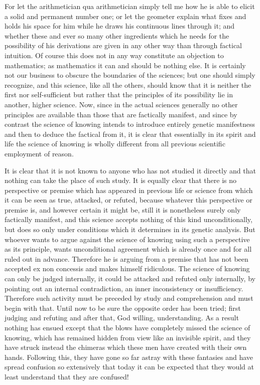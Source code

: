 For let the arithmetician qua arithmetician simply tell me
how he is able to elicit a solid and permanent number one;
or let the geometer explain what fixes and holds his space
for him while he draws his continuous lines through it;
and whether these and ever so many other ingredients
which he needs for the possibility of his derivations are
given in any other way than through factical intuition.
Of course this does not in any way constitute an
objection to mathematics;
as mathematics it can and should be nothing else.
It is certainly not our business to obscure the boundaries of the sciences;
but one should simply recognize, and this science, like all the others,
should know that it is neither the first nor self-sufficient
but rather that the principles of its possibility lie in another,
higher science.
Now, since in the actual sciences generally
no other principles are available than those
that are factically manifest, and since by contrast
the science of knowing intends to introduce
entirely genetic manifestness and then to
deduce the factical from it,
it is clear that essentially in its spirit and life
the science of knowing is wholly different from
all previous scientific employment of reason.

It is clear that it is not known to anyone who has not studied it directly
and that nothing can take the place of such study.
It is equally clear that there is no perspective or premise
which has appeared in previous life or science
from which it can be seen as true, attacked, or refuted,
because whatever this perspective or premise is,
and however certain it might be,
still it is nonetheless surely only factically manifest,
and this science accepts nothing of this kind unconditionally,
but does so only under conditions
which it determines in its genetic analysis.
But whoever wants to argue against the science
of knowing using such a perspective as its principle,
wants unconditional agreement which is already
once and for all ruled out in advance.
Therefore he is arguing from a premise that has not been accepted
{ex non concessis} and makes himself ridiculous.
The science of knowing can only be judged internally,
it could be attacked and refuted only internally,
by pointing out an internal contradiction,
an inner inconsistency or insufficiency.
Therefore such activity must be preceded
by study and comprehension and must begin with that.
Until now to be sure the opposite order has been tried;
first judging and refuting and after that, God willing, understanding.
As a result nothing has ensued except that the blows have
completely missed the science of knowing,
which has remained hidden from view like an invisible spirit,
and they have struck instead the chimeras which
these men have created with their own hands.
Following this, they have gone so far astray with these fantasies
and have spread confusion so extensively that today
it can be expected that they would at least
understand that they are confused!

